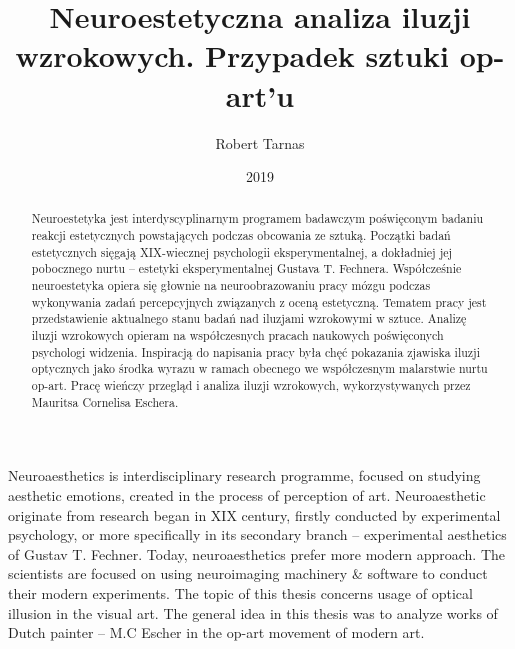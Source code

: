 \documentclass[licencjacka]{kdypl}
\author{Robert Tarnas}
\title{Neuroestetyczna analiza iluzji wzrokowych. Przypadek sztuki op-art'u}%
\date {2019}
\begin{document}
\begin{abstract}
\noindent%

Neuroestetyka jest interdyscyplinarnym programem badawczym poświęconym badaniu reakcji estetycznych powstających podczas obcowania ze sztuką. Początki badań estetycznych sięgają XIX-wiecznej psychologii eksperymentalnej, a dokładniej jej pobocznego nurtu – estetyki eksperymentalnej Gustava T. Fechnera. Współcześnie neuroestetyka opiera się głownie na neuroobrazowaniu pracy mózgu podczas wykonywania zadań percepcyjnych związanych z oceną estetyczną. Tematem pracy jest przedstawienie aktualnego stanu badań nad iluzjami wzrokowymi w sztuce. Analizę iluzji wzrokowych opieram na współczesnych pracach naukowych poświęconych psychologi widzenia. Inspiracją do napisania pracy była chęć pokazania zjawiska iluzji optycznych jako środka wyrazu w ramach obecnego we współczesnym malarstwie nurtu op-art. Pracę wieńczy przegląd i analiza iluzji wzrokowych, wykorzystywanych przez Mauritsa Cornelisa Eschera.

\end{abstract}


\begin{abstracteng}
\noindent%

Neuroaesthetics is interdisciplinary research programme, focused on studying aesthetic emotions, created in the process of perception of art. Neuroaesthetic originate from research began in XIX century, firstly conducted by experimental psychology, or more specifically in its secondary branch – experimental aesthetics of Gustav T. Fechner. Today, neuroaesthetics prefer more modern approach. The scientists are focused on using neuroimaging machinery \& software to conduct their modern experiments. The topic of this thesis concerns usage of optical illusion in the visual art. The general idea in this thesis was to analyze works of Dutch painter – M.C Escher in the op-art movement of modern art.


\end{abstracteng}


\maketitle
\end{document}
